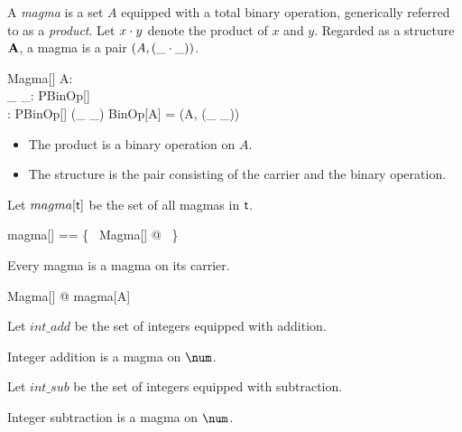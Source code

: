 \documentclass{amsart}
\begin{document}
A \textit{magma} is a set $A$ equipped with a total binary operation, 
generically referred to as a \textit{product}.
Let $x \mathbin{\cdot} y$ denote the product of $x$ and $y$.
Regarded as a structure $\mathbf{A}$, a magma is a pair $(A, (\_ \mathbin{\cdot} \_))$.

\begin{schema}{Magma}[\genT]
	A: \power \genT \\
	\_ \opG \_: PBinOp[\genT] \\
	\strucA: \power \genT \cross PBinOp[\genT]
\where
	(\_ \opG \_) \in BinOp[A]
\also
	\strucA = (A, (\_ \opG \_))
\end{schema}

\begin{itemize}
	\item The product is a binary operation on $A$.
	\item The structure is the pair consisting of the carrier and the binary operation.
\end{itemize}

Let $magma[\mathsf{t}]$ be the set of all magmas in $\mathsf{t}$.
\begin{zed}
	magma[\genT] == \{~ Magma[\genT] @ \strucA ~\}
\end{zed}

\begin{remark}
Every magma is a magma on its carrier.

\begin{zed}
	\forall Magma[\setT] @ \strucA \in magma[A]
\end{zed}

\end{remark}

\begin{example}

Let $int\_add$ be the set of integers equipped with addition.

Integer addition is a magma on $\num$.
\end{example}

\begin{example}

Let $int\_sub$ be the set of integers equipped with subtraction.


Integer subtraction is a magma on $\num$.


\end{example}
\end{document}
